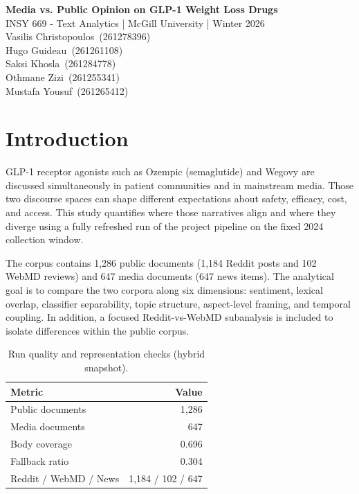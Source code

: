 \documentclass[10pt,letterpaper,twocolumn]{article}
\begin{document}
\begin{center}
{\LARGE \textbf{Media vs. Public Opinion on GLP-1 Weight Loss Drugs}}\\
\vspace{0.3em}
INSY 669 - Text Analytics | McGill University | Winter 2026\\
\vspace{0.6em}
{\small
Vasilis Christopoulos~(261278396)\\
Hugo Guideau~(261261108)\\
Saksi Khosla~(261284778)\\
Othmane Zizi~(261255341)\\
Mustafa Yousuf~(261265412)
}
\end{center}

\section{Introduction}
GLP-1 receptor agonists such as Ozempic (semaglutide) and Wegovy are discussed simultaneously in patient communities and in mainstream media. Those two discourse spaces can shape different expectations about safety, efficacy, cost, and access. This study quantifies where those narratives align and where they diverge using a fully refreshed run of the project pipeline on the fixed 2024 collection window.

The corpus contains 1,286 public documents (1,184 Reddit posts and 102 WebMD reviews) and 647 media documents (647 news items). The analytical goal is to compare the two corpora along six dimensions: sentiment, lexical overlap, classifier separability, topic structure, aspect-level framing, and temporal coupling. In addition, a focused Reddit-vs-WebMD subanalysis is included to isolate differences within the public corpus.

\begin{table}[H]
\centering
\caption{Run quality and representation checks (hybrid snapshot).}
\begin{tabular}{l r}
\hline
Metric & Value \\
\hline
Public documents & 1,286 \\
Media documents & 647 \\
Body coverage & 0.696 \\
Fallback ratio & 0.304 \\
Reddit / WebMD / News & 1,184 / 102 / 647 \\
\hline
\end{tabular}
\end{table}
\end{document}
